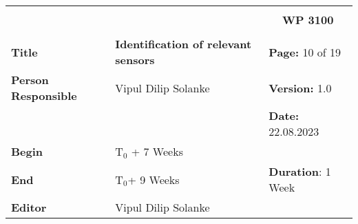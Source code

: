 \begin{table}[!h]
  \begin{center}
    \begin{tabular}{|p{35mm}||p{55mm}|p{50mm}||p{40mm}|}
      \hline
      \multicolumn{3}{|l||}{\textbf{}} & \multicolumn{1}{c|}{}                                                                                                                                                \\
      \multicolumn{3}{|l||}{\textbf{}} & \multicolumn{1}{c|}{\textbf{WP 3100}}                                                                                                                                \\
      \multicolumn{3}{|l||}{\textbf{}} & \multicolumn{1}{c|}{}                                                                                                                                                \\
      \hline\hline
      \textbf{Title}                   & \multicolumn{2}{p{7cm}||}{\textbf{Identification of relevant sensors}}
                                       & \textbf{Page:} 10 of 19                                                                                                                                            \\
      \hline
      \textbf{Person Responsible}        & \multicolumn{2}{l||}{Vipul Dilip Solanke}                                                                                                   & \textbf{Version:} 1.0   \\
      \hline
      \multicolumn{3}{|l||}{}          & \textbf{Date:} 22.08.2023                                                                                                                                          \\
      \hline\hline
      \textbf{Begin}                  & \multicolumn{2}{l||}{T$_0$ + 7 Weeks}                                                                                                                &                         \\
      \hline
      \textbf{End}                    & \multicolumn{2}{l||}{T$_0$+ 9 Weeks}                                                                                                        & \textbf{Duration}: 1 Week \\
      \hline\hline
      \textbf{Editor}              & \multicolumn{3}{l|}{Vipul Dilip Solanke}                                                                                                                              \\

\end{tabular}
\end{center}
\end{table}
